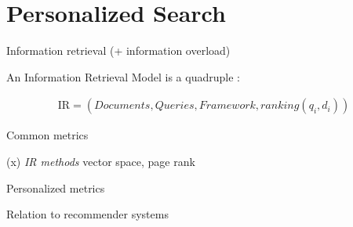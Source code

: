 \section{Personalized Search}
\label{sec:search}

Information retrieval (+ information overload)

An Information Retrieval Model is a quadruple \citep[p23]{Baeza-Yates1999}:

\begin{eqnarray}
  \mathrm{IR} = (Documents, Queries, Framework, ranking(q_i, d_i))
\end{eqnarray}

Common metrics

(x) \emph{IR methods} vector space, page rank

Personalized metrics

Relation to recommender systems




